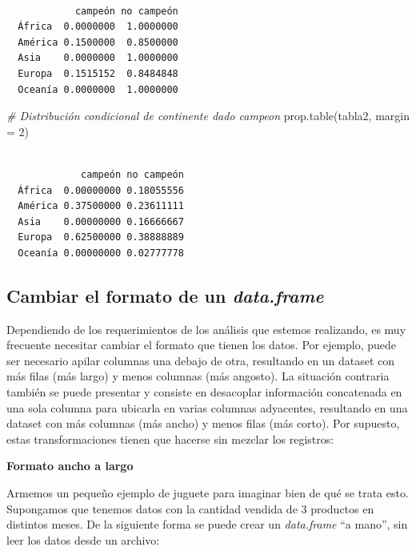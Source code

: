 \documentclass[
]{book}
\newenvironment{Shaded}{\begin{snugshade}}{\end{snugshade}}
\newcommand{\AttributeTok}[1]{\textcolor[rgb]{0.77,0.63,0.00}{#1}}
\newcommand{\CommentTok}[1]{\textcolor[rgb]{0.56,0.35,0.01}{\textit{#1}}}
\newcommand{\DecValTok}[1]{\textcolor[rgb]{0.00,0.00,0.81}{#1}}
\newcommand{\FunctionTok}[1]{\textcolor[rgb]{0.00,0.00,0.00}{#1}}
\newcommand{\NormalTok}[1]{#1}
\begin{document}
\begin{verbatim}
         
            campeón no campeón
  África  0.0000000  1.0000000
  América 0.1500000  0.8500000
  Asia    0.0000000  1.0000000
  Europa  0.1515152  0.8484848
  Oceanía 0.0000000  1.0000000
\end{verbatim}

\begin{Shaded}
\begin{Highlighting}[]
\CommentTok{\# Distribución condicional de continente dado campeon}
\FunctionTok{prop.table}\NormalTok{(tabla2, }\AttributeTok{margin =} \DecValTok{2}\NormalTok{)}
\end{Highlighting}
\end{Shaded}

\begin{verbatim}
         
             campeón no campeón
  África  0.00000000 0.18055556
  América 0.37500000 0.23611111
  Asia    0.00000000 0.16666667
  Europa  0.62500000 0.38888889
  Oceanía 0.00000000 0.02777778
\end{verbatim}

\hypertarget{cambiar-el-formato-de-un-data.frame}{%
\subsection{\texorpdfstring{Cambiar el formato de un \emph{data.frame}}{Cambiar el formato de un data.frame}}\label{cambiar-el-formato-de-un-data.frame}}

Dependiendo de los requerimientos de los análisis que estemos realizando, es muy frecuente necesitar cambiar el formato que tienen los datos. Por ejemplo, puede ser necesario apilar columnas una debajo de otra, resultando en un dataset con más filas (más largo) y menos columnas (más angosto). La situación contraria también se puede presentar y consiste en desacoplar información concatenada en una sola columna para ubicarla en varias columnas adyacentes, resultando en una dataset con más columnas (más ancho) y menos filas (más corto). Por supuesto, estas transformaciones tienen que hacerse sin mezclar los registros:

\textbf{Formato ancho a largo}

Armemos un pequeño ejemplo de juguete para imaginar bien de qué se trata esto. Supongamos que tenemos datos con la cantidad vendida de 3 productos en distintos meses. De la siguiente forma se puede crear un \emph{data.frame} ``a mano'', sin leer los datos desde un archivo:
\end{document}
